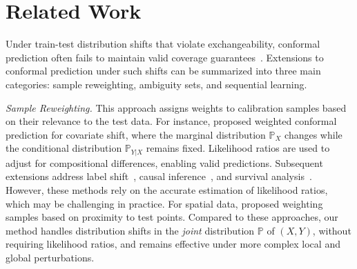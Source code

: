 \section{Related Work}
\label{subsec:related:work}

Under train-test distribution shifts that violate exchangeability, conformal prediction often fails to maintain valid coverage guarantees~\cite{tibshirani2019conformal}. Extensions to conformal prediction under such shifts can be summarized into three main categories: sample reweighting, ambiguity sets, and sequential learning.

\medskip

\noindent\emph{Sample Reweighting.} This approach assigns weights to calibration samples based on their relevance to the test data. For instance, \cite{tibshirani2019conformal} proposed weighted conformal prediction for covariate shift, where the marginal distribution $\mathbb P_X$ changes while the conditional distribution $\mathbb P_{Y|X}$ remains fixed. Likelihood ratios are used to adjust for compositional differences, enabling valid predictions. Subsequent extensions address label shift~\cite{Podkopaev_2021}, causal inference~\cite{Lei_2021}, and survival analysis~\cite{Candes_2023, Gui_2022}. However, these methods rely on the accurate estimation of likelihood ratios, which may be challenging in practice. For spatial data, \cite{Mao_2022} proposed weighting samples based on proximity to test points. Compared to these approaches, our method handles distribution shifts in the \textit{joint} distribution $\mathbb P$ of $(X,Y)$, without requiring likelihood ratios, and remains effective under more complex local and global perturbations.

\medskip

